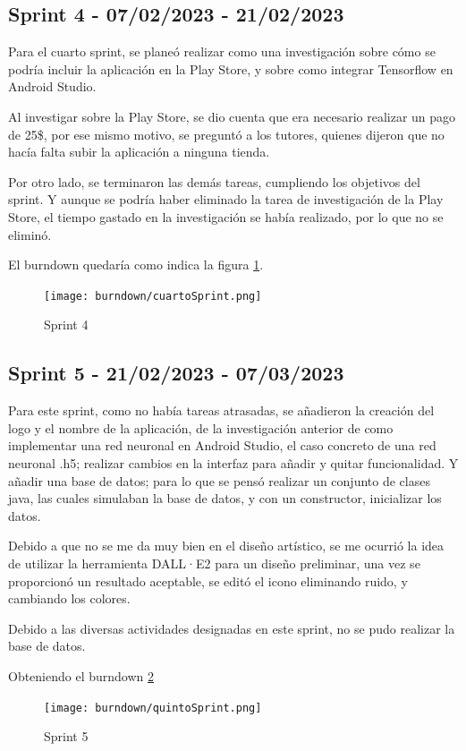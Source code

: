 \subsection{Sprint 4 - 07/02/2023 - 21/02/2023}
Para el cuarto sprint, se planeó realizar como una investigación sobre cómo se podría incluir la aplicación en la Play Store, y sobre como integrar Tensorflow en Android Studio.

Al investigar sobre la Play Store, se dio cuenta que era necesario realizar un pago de 25\$, por ese mismo motivo, se preguntó a los tutores, quienes dijeron que no hacía falta subir la aplicación a ninguna tienda.

Por otro lado, se terminaron las demás tareas, cumpliendo los objetivos del sprint. Y aunque se podría haber eliminado la tarea de investigación de la Play Store, el tiempo gastado en la investigación se había realizado, por lo que no se eliminó.

El burndown quedaría como indica la figura \ref{fig:Sprint4}. 
\begin{figure}[!ht]
         \centering
         \texttt{[image: burndown/cuartoSprint.png]}
         \caption{Sprint 4}
         \label{fig:Sprint4}
\end{figure}


\subsection{Sprint 5 - 21/02/2023 - 07/03/2023}
Para este sprint, como no había tareas atrasadas, se añadieron la creación del logo y el nombre de la aplicación, de la investigación anterior de como implementar una red neuronal en Android Studio, el caso concreto de una red neuronal .h5; realizar cambios en la interfaz para añadir y quitar funcionalidad. Y añadir una base de datos; para lo que se pensó realizar un conjunto de clases java, las cuales simulaban la base de datos, y con un constructor, inicializar los datos.

Debido a que no se me da muy bien en el diseño artístico, se me ocurrió la idea de utilizar la herramienta DALL·E2 para un diseño preliminar, una vez se proporcionó un resultado aceptable, se editó el icono eliminando ruido, y cambiando los colores.

Debido a las diversas actividades designadas en este sprint, no se pudo realizar la base de datos.

Obteniendo el burndown \ref{fig:Sprint5}
\begin{figure}[!ht]
         \centering
         \texttt{[image: burndown/quintoSprint.png]}
         \caption{Sprint 5}
         \label{fig:Sprint5}
\end{figure}

